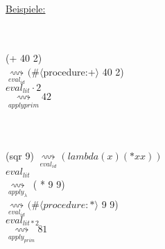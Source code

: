 \documentclass[a4paper,12pt]{article}
\begin{document}
\uline{Beispiele:}\\\begin{tabular}{c}
\hline
\end{tabular}\\
(+ 40 2)\\
$\underset{eval_{id}}{\rightsquigarrow} (\#\langle$procedure:+$\rangle$ 40 2)\\
$eval_{lit} \cdot 2$\\
$\underset{apply prim}{\rightsquigarrow} 42 $\\
\\\\\\
(sqr 9)
$\underset{eval_{id}}{\rightsquigarrow } (lambda (x) (* x x))$\\
$eval_{lit}$\\
$\underset{apply_\lambda}{\rightsquigarrow}$ ( * 9 9)\\
$\underset{eval_{id}}{\rightsquigarrow}(\#\langle procedure:*\rangle $ 9 9)\\
$eval_{lit *2}$\\
$\underset{apply_{prim}}{\rightsquigarrow } 81$\\
\end{document}

